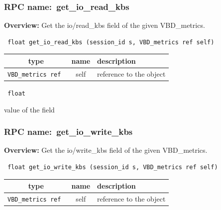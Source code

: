 \subsubsection{RPC name:~get\_io\_read\_kbs}

{\bf Overview:} 
Get the io/read\_kbs field of the given VBD\_metrics.

\begin{verbatim} float get_io_read_kbs (session_id s, VBD_metrics ref self)\end{verbatim}



 
\vspace{0.3cm}
\begin{tabular}{|c|c|p{7cm}|}
 \hline
{\bf type} & {\bf name} & {\bf description} \\ \hline
{\tt VBD\_metrics ref } & self & reference to the object \\ \hline 

\end{tabular}

\vspace{0.3cm}

{\tt 
float
}


value of the field
\vspace{0.3cm}
\vspace{0.3cm}
\vspace{0.3cm}
\subsubsection{RPC name:~get\_io\_write\_kbs}

{\bf Overview:} 
Get the io/write\_kbs field of the given VBD\_metrics.

\begin{verbatim} float get_io_write_kbs (session_id s, VBD_metrics ref self)\end{verbatim}



 
\vspace{0.3cm}
\begin{tabular}{|c|c|p{7cm}|}
 \hline
{\bf type} & {\bf name} & {\bf description} \\ \hline
{\tt VBD\_metrics ref } & self & reference to the object \\ \hline 

\end{tabular}

